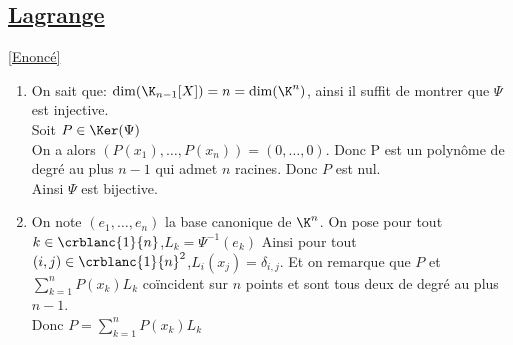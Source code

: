 \documentclass{book}
\begin{document}
	\subsection{\underline{Lagrange} }
	\label{sec:Lagrange}
	\textcolor{blue}{\hyperref[Lagrange]{[Enoncé]}}\\
	\begin{enumerate}
		\item 
		On sait que: $\dim(\K_{n-1}[X])=n=\dim(\K^n)$, ainsi il suffit de montrer que $\Psi$ est injective.
		\\Soit $P\in\Ker(\Psi)$
		\\On a alors $(P(x_1),\dots,P(x_n))=(0,\dots,0)$. Donc P est un polynôme de degré au plus $n-1$ qui admet $n$ racines. Donc $P$ est nul.
		\\Ainsi $\Psi$ est bijective.
		\item 
		On note $(e_1,\dots,e_n)$ la base canonique de $\K^{n}$.
		On pose pour tout $k\in\crblanc{1}{n}$,$L_k=\Psi^{-1}(e_k)$
		Ainsi pour tout $(i,j)\in\crblanc{1}{n}^2$,$L_i(x_j)=\delta_{i,j}$.
		Et on remarque que $P$ et $\displaystyle\sum\limits_{k=1}^nP(x_k)L_k$ coïncident sur $n$ points et sont tous deux de degré au plus $n-1$. 
		\\Donc $P=\displaystyle\sum\limits_{k=1}^nP(x_k)L_k$
	\end{enumerate}
	
\end{document}
